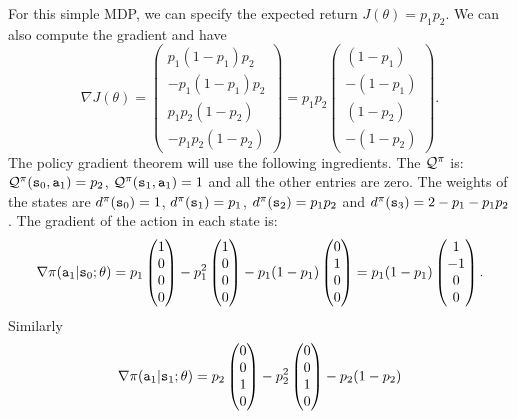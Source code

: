 \begin{example}
For this simple MDP, we can specify the expected return
$J(\theta)=p_1p_2$. We can also compute the gradient and have
\[
\nabla J(\theta)=\begin{pmatrix}p_1(1-p_1)p_2\\
-p_1(1-p_1)p_2 \\  p_1 p_2 (1-p_2) \\ -p_1 p_2 (1-p_2)\end{pmatrix}= p_1 p_2\begin{pmatrix}(1-p_1)\\
-(1-p_1) \\  (1-p_2) \\ - (1-p_2)\end{pmatrix}.
\]
The policy gradient theorem will use the following ingredients. The
$\mathcal{Q}^\pi$ is: $\mathcal{Q}^\pi({\tt s}_0,{\tt a}_1)=p_2$,
$\mathcal{Q}^\pi({\tt s}_1,{\tt a}_1)=1$ and all the other entries are
zero. The weights of the states are $d^{\pi}({\tt s}_0)=1$,
$d^{\pi}({\tt s}_1)=p_1$, $d^{\pi}({\tt s}_2)=p_1 p_2$ and
$d^{\pi}({\tt s}_3)=2-p_1-p_1 p_2$. The gradient of the action in each
state is:
\[
\nabla \pi({\tt a}_1|{\tt s}_0;\theta)=
p_1\begin{pmatrix}1\\0\\0\\0\end{pmatrix} - p^2_1
\begin{pmatrix}1\\0\\0\\0\end{pmatrix} - p_1(1-p_1)
\begin{pmatrix}0\\1\\0\\0\end{pmatrix} = p_1(1-p_1)\begin{pmatrix}1\\-1\\0\\0\end{pmatrix}.
\]
Similarly
\[
\nabla \pi({\tt a}_1|{\tt s}_1;\theta)=
p_2\begin{pmatrix}0\\0\\1\\0\end{pmatrix} - p_2^2
\begin{pmatrix}0\\0\\1\\0\end{pmatrix} - p_2(1-p_2)
\]
\end{example}
